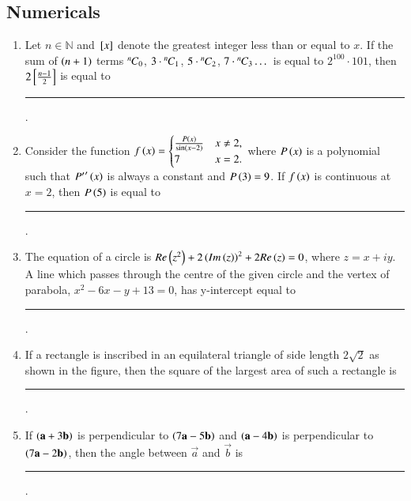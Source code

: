 \documentclass[journal,12pt,onecolumn]{IEEEtran}
\theoremstyle{remark}
\begin{document}
\subsection{Numericals}
\begin{enumerate}

\item Let $n\in \mathbb{N}$ and ${}\left[x\right]$ denote the greatest integer less than or equal to $x$. If the sum of $\left(n+1\right)$ terms ${{}^{n}\mkern-1muC_{0}}$, $3\cdot{{}^{n}\mkern-1muC_{1}}$, $5\cdot{{}^{n}\mkern-1muC_{2}}$, $7\cdot{{}^{n}\mkern-1muC_{3}} \dots$ is equal to $2^{100}\cdot 101$, then $2{}\left[\frac{n-1}{2}\right]$ is equal to \rule{1cm}{0.15mm}.

\hfill{}

\item Consider the function $f\left(x\right) = \begin{cases} \frac{P\left(x\right)}{\sin\left(x-2\right)} & x\neq 2, \\7 & x=2 .\end{cases}$ where $P\left(x\right)$ is a polynomial such that ${P^\prime}^\prime\left(x\right)$ is always a constant and $P\left(3\right)=9$. If $f\left(x\right)$ is continuous at $x=2$, then $P\left(5\right)$ is equal to \rule{1cm}{0.15mm}.

\hfill{}

\item The equation of a circle is $Re\left(z^2\right)+2\left(Im\left(z\right)\right)^2+2Re\left(z\right)=0$, where $z=x+iy$. A line which passes through the centre of the given circle and the vertex of parabola, $x^2-6x-y+13=0$, has y-intercept equal to \rule{1cm}{0.15mm}.

\hfill{}

\item If a rectangle is inscribed in an equilateral triangle of side length $2\sqrt{2}$ as shown in the figure, then the square of the largest area of such a rectangle is \rule{1cm}{0.15mm}.
\\

\hfill{}

\item If $\left(\mathbf{a}+3\mathbf{b}\right)$ is perpendicular to $\left(7\mathbf{a}-5\mathbf{b}\right)$ and $\left(\mathbf{a}-4\mathbf{b}\right)$ is perpendicular to $\left(7\mathbf{a}-2\mathbf{b}\right)$, then the angle between $\vec{a}$ and $\vec{b}$  is \rule{1cm}{0.15mm}.


\end{enumerate}
\end{document}
